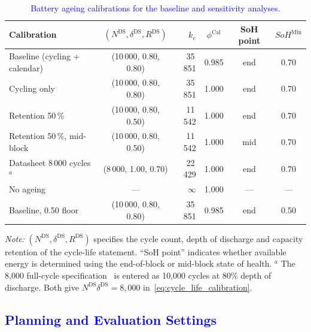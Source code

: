 \documentclass[preprint,12pt]{elsarticle}
\begin{document}
\begin{table}[htbp!]
    \centering
    \caption{\textcolor{blue}{Battery ageing calibrations for the baseline and sensitivity analyses.}}
    \footnotesize\setlength{\tabcolsep}{4pt}
    \begin{tabular}{l c r c c c}
        \toprule
        Calibration & $(N^{\text{DS}}, \delta^{\text{DS}}, R^{\text{DS}})$ & $k_e$ & $\phi^{\text{Cal}}$ & SoH point & $SoH^{\text{Min}}$ \\
        \midrule
        Baseline (cycling + calendar) & (10\,000, 0.80, 0.80) & 35\,851 & 0.985 & end & 0.70 \\
        Cycling only                  & (10\,000, 0.80, 0.80) & 35\,851 & 1.000 & end & 0.70 \\
        Retention 50\,\%              & (10\,000, 0.80, 0.50) & 11\,542 & 1.000 & end & 0.70 \\
        Retention 50\,\%, mid-block   & (10\,000, 0.80, 0.50) & 11\,542 & 1.000 & mid & 0.70 \\
        Datasheet 8\,000 cycles$^{a}$ & (8\,000, 1.00, 0.70)  & 22\,429 & 1.000 & end & 0.70 \\
        No ageing                     & ---                   & $\infty$ & 1.000 & --- & --- \\
        Baseline, 0.50 floor          & (10\,000, 0.80, 0.80) & 35\,851 & 0.985 & end & 0.50 \\
        \bottomrule
    \end{tabular}
    \par\smallskip
    \begin{minipage}{\linewidth}
        \footnotesize\raggedright
        \textit{Note:} $(N^{\text{DS}}, \delta^{\text{DS}}, R^{\text{DS}})$ specifies the cycle count, depth of discharge and capacity retention of the cycle-life statement. ``SoH point'' indicates whether available energy is determined using the end-of-block or mid-block state of health. $^{a}$ The 8{,}000 full-cycle specification~\cite{eve_mb31_datasheet} is entered as 10{,}000 cycles at 80\% depth of discharge. Both give $N^{\text{DS}}\delta^{\text{DS}} = 8{,}000$ in~\eqref{eq:cycle_life_calibration}.
    \end{minipage}
    \label{tab:ageing_calibrations}
\end{table}

\subsection{\textcolor{blue}{Planning and Evaluation Settings}}
\label{sec:case_settings}
\end{document}
